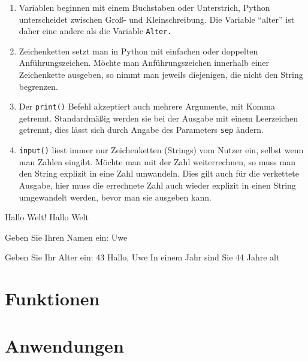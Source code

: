 \documentclass[12pt,ngerman]{scrreprt}
\newcommand{\ta}[1]{\textattachfile[color=1 0 0]{#1}{\faFilePowerpointO}}
\newcommand{\pypy}[2]{}
\newcommand{\pypyl}[3]{}
\begin{document}
\begin{enumerate}
\item Variablen beginnen mit einem Buchstaben oder Unterstrich, Python unterscheidet zwischen Groß- und Kleinschreibung. Die Variable \enquote{alter} ist daher eine andere als die Variable \texttt{Alter.}
\item Zeichenketten setzt man in Python mit einfachen oder doppelten Anführungszeichen. Möchte man Anführungszeichen innerhalb einer Zeichenkette ausgeben, so nimmt man jeweils diejenigen, die nicht den String begrenzen. 
\item Der \texttt{print()} Befehl akzeptiert auch mehrere Argumente, mit Komma getrennt. Standardmäßig werden sie bei der Ausgabe mit einem Leerzeichen getrennt, dies lässt sich durch Angabe des Parameters \texttt{sep} ändern.
\item \texttt{input()} liest immer nur Zeichenketten (Strings) vom Nutzer ein, selbst wenn man Zahlen eingibt. Möchte man mit der Zahl weiterrechnen, so muss man den String explizit in eine Zahl umwandeln. Dies gilt auch für die verkettete Ausgabe, hier muss die errechnete Zahl auch wieder explizit in einen String umgewandelt werden, bevor man sie ausgeben kann.
\end{enumerate} 




\pypyl{Eingabe und Ausgabe}{Codes/inout.py}{inout}


\begin{ausgabe}[caption={Ausgabe von Listing \ref{inout}}]
Hallo Welt!
Hallo Welt

Geben Sie Ihren Namen ein: Uwe

Geben Sie Ihr Alter ein: 43
Hallo, Uwe
In einem Jahr sind Sie 44 Jahre alt
\end{ausgabe}



\pypy{sdfdfd}{Codes/helloworld.py}

\ta{Codes/hello_world.py}

\pypy{sdfdfd}{Codes/helloworld.py}

\pypy{sdfdfd}{Codes/hello_world.py}

\chapter{Funktionen}

\chapter{Anwendungen}
\end{document}
